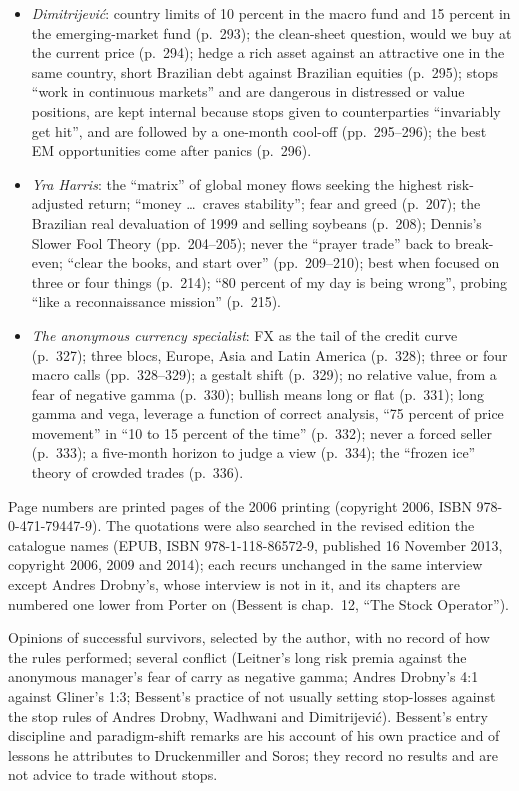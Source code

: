\begin{qfmethod}
\begin{itemize}
\item \emph{Dimitrijević}: country limits of 10 percent in the macro fund and 15 percent in the emerging-market fund (p.~293); the clean-sheet question, would we buy at the current price (p.~294); hedge a rich asset against an attractive one in the same country, short Brazilian debt against Brazilian equities (p.~295); stops ``work in continuous markets'' and are dangerous in distressed or value positions, are kept internal because stops given to counterparties ``invariably get hit'', and are followed by a one-month cool-off (pp.~295--296); the best EM opportunities come after panics (p.~296).
\item \emph{Yra Harris}: the ``matrix'' of global money flows seeking the highest risk-adjusted return; ``money \dots\ craves stability''; fear and greed (p.~207); the Brazilian real devaluation of 1999 and selling soybeans (p.~208); Dennis's Slower Fool Theory (pp.~204--205); never the ``prayer trade'' back to break-even; ``clear the books, and start over'' (pp.~209--210); best when focused on three or four things (p.~214); ``80 percent of my day is being wrong'', probing ``like a reconnaissance mission'' (p.~215).
\item \emph{The anonymous currency specialist}: FX as the tail of the credit curve (p.~327); three blocs, Europe, Asia and Latin America (p.~328); three or four macro calls (pp.~328--329); a gestalt shift (p.~329); no relative value, from a fear of negative gamma (p.~330); bullish means long or flat (p.~331); long gamma and vega, leverage a function of correct analysis, ``75 percent of price movement'' in ``10 to 15 percent of the time'' (p.~332); never a forced seller (p.~333); a five-month horizon to judge a view (p.~334); the ``frozen ice'' theory of crowded trades (p.~336).
\end{itemize}

 Page numbers are printed pages of the 2006 printing (copyright 2006, ISBN 978-0-471-79447-9). The quotations were also searched in the revised edition the catalogue names (EPUB, ISBN 978-1-118-86572-9, published 16 November 2013, copyright 2006, 2009 and 2014); each recurs unchanged in the same interview except Andres Drobny's, whose interview is not in it, and its chapters are numbered one lower from Porter on (Bessent is chap.~12, ``The Stock Operator'').

 Opinions of successful survivors, selected by the author, with no record of how the rules performed; several conflict (Leitner's long risk premia against the anonymous manager's fear of carry as negative gamma; Andres Drobny's 4:1 against Gliner's 1:3; Bessent's practice of not usually setting stop-losses against the stop rules of Andres Drobny, Wadhwani and Dimitrijević). Bessent's entry discipline and paradigm-shift remarks are his account of his own practice and of lessons he attributes to Druckenmiller and Soros; they record no results and are not advice to trade without stops.


\end{qfmethod}
